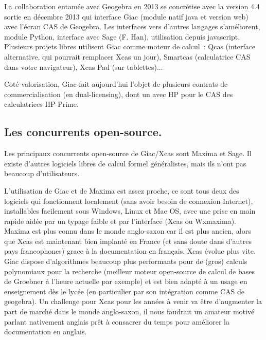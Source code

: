 \documentclass[a4paper,11pt]{article}
\begin{document}
La collaboration entam\'ee avec Geogebra en 2013
se concr\'etise avec la version 4.4 sortie en d\'ecembre 2013
qui interface Giac (module natif java et version
web) avec l'\'ecran CAS de Geogebra.
Les interfaces vers d'autres langages s'am\'eliorent,
module Python, interface avec Sage (F. Han),
utilisation depuis javascript. Plusieurs projets
libres utilisent Giac comme moteur de calcul~: Qcas (interface
alternative, qui pourrait remplacer Xcas un jour),
Smartcas (calculatrice CAS dans votre navigateur),
Xcas Pad (sur tablettes)...

Cot\'e valorisation, Giac fait aujourd'hui l'objet de
plusieurs contrats de
commercialisation (en dual-licensing), dont un avec HP
pour le CAS des calculatrices HP-Prime.

\subsection{Les concurrents open-source.} \label{sec:concurrents}
Les principaux concurrents open-source de Giac/Xcas sont Maxima et
Sage. Il existe d'autres logiciels libres de calcul formel g\'en\'eralistes, mais ils
n'ont pas beaucoup d'utilisateurs.

L'utilisation de Giac et de Maxima est assez proche, ce sont
tous deux des logiciels qui fonctionnent localement (sans
avoir besoin de connexion Internet),
installables facilement sous Windows, Linux
et Mac OS, avec une prise en main rapide
aid\'ee par un typage faible et par l'interface
(Xcas ou Wxmaxima). Maxima est plus connu dans le monde anglo-saxon
car il est plus ancien, alors que Xcas est maintenant bien
implant\'e en France (et sans doute dans d'autres pays francophones)
grace \`a la documentation en fran\c{c}ais. Xcas \'evolue plus vite.
Giac dispose d'algorithmes beaucoup plus
performants pour de (gros) calculs polynomiaux pour la recherche
(meilleur moteur open-source de calcul de bases de Groebner 
\`a l'heure actuelle par exemple)
et est bien adapt\'e \`a un usage
en enseignement d\`es le lyc\'ee (en particulier 
par son int\'egration comme CAS de geogebra). Un challenge pour Xcas
pour les ann\'ees \`a venir va \^etre d'augmenter la part
de march\'e dans le monde anglo-saxon, il nous faudrait
un amateur motiv\'e parlant nativement anglais pr\^et \`a consacrer
du temps pour am\'eliorer la documentation en anglais.
\end{document}

